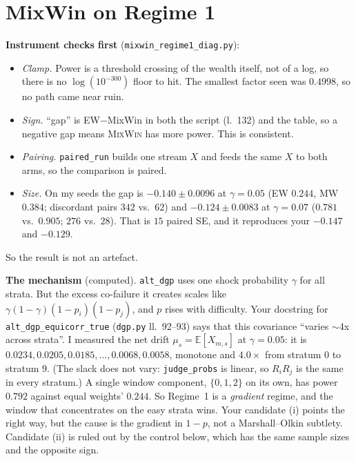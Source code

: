 \documentclass[11pt]{article}
\newcommand{\E}{\mathbb{E}}
\begin{document}
\section{MixWin on Regime 1}\label{sec:mixwin}
\textbf{Instrument checks first} (\texttt{mixwin\_regime1\_diag.py}):
\begin{itemize}[nosep]
\item \emph{Clamp.} Power is a threshold crossing of the wealth itself, not of a log, so there is no $\log(10^{-300})$ floor to hit. The smallest factor seen was $0.4998$, so no path came near ruin.
\item \emph{Sign.} ``gap'' is EW$-$MixWin in both the script (l.~132) and the table, so a negative gap means \textsc{MixWin} has more power. This is consistent.
\item \emph{Pairing.} \texttt{paired\_run} builds one stream $X$ and feeds the same $X$ to both arms, so the comparison is paired.
\item \emph{Size.} On my seeds the gap is $-0.140\pm0.0096$ at $\gamma=0.05$ (EW $0.244$, MW $0.384$; discordant pairs $342$ vs.\ $62$) and $-0.124\pm0.0083$ at $\gamma=0.07$ ($0.781$ vs.\ $0.905$; $276$ vs.\ $28$). That is $15$ paired SE, and it reproduces your $-0.147$ and $-0.129$.
\end{itemize}
So the result is not an artefact.

\textbf{The mechanism} (computed). \texttt{alt\_dgp} uses one shock probability $\gamma$ for all strata. But the excess co-failure it creates scales like $\gamma(1-\gamma)(1-p_i)(1-p_j)$, and $p$ rises with difficulty. Your docstring for \texttt{alt\_dgp\_equicorr\_true} (\texttt{dgp.py} ll.~92--93) says that this covariance ``varies $\sim$4x across strata''.
I measured the net drift $\mu_s=\E[X_{m,s}]$ at $\gamma=0.05$: it is $0.0234, 0.0205, 0.0185, \dots, 0.0068, 0.0058$, monotone and $4.0\times$ from stratum $0$ to stratum $9$. (The slack does not vary: \texttt{judge\_probs} is linear, so $R_iR_j$ is the same in every stratum.)
A single window component, $\{0,1,2\}$ on its own, has power $0.792$ against equal weights' $0.244$.
So Regime~1 is a \emph{gradient} regime, and the window that concentrates on the easy strata wins. Your candidate (i) points the right way, but the cause is the gradient in $1-p$, not a Marshall--Olkin subtlety. Candidate (ii) is ruled out by the control below, which has the same sample sizes and the opposite sign.
\end{document}
